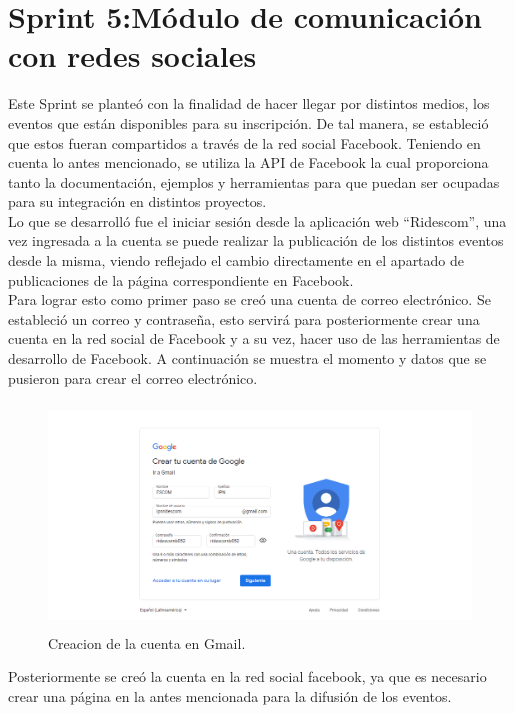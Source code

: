	\section{Sprint 5:Módulo de comunicación con redes sociales}	
	\noindent Este Sprint se planteó con la finalidad de hacer llegar por distintos medios, los eventos que están disponibles para su inscripción. De tal manera, se estableció que estos fueran compartidos a través de la red social Facebook.
	Teniendo en cuenta lo antes mencionado, se utiliza la API de Facebook la cual proporciona tanto la documentación, ejemplos y herramientas para que puedan ser ocupadas para su integración en distintos proyectos. \\
	\noindent Lo que se desarrolló fue el iniciar sesión desde la aplicación web “Ridescom”, una vez ingresada a la cuenta se puede realizar la publicación de los distintos eventos desde la misma, viendo reflejado el cambio directamente en el apartado de publicaciones de la página correspondiente en Facebook. \\
	\noindent Para lograr esto como primer paso se creó una cuenta de correo electrónico. Se estableció un correo y contraseña, esto servirá para posteriormente crear una cuenta en la red social de Facebook y a su vez, hacer uso de las herramientas de desarrollo de Facebook.
	A continuación se muestra el momento y datos que se pusieron para crear el correo electrónico.
	
	\begin{figure}[hbt!]
		\centering
		\includegraphics[width=12cm, height=6cm]{Imagenes/CreacionCuentaFB/CuentaGmail}
		\caption{Creacion de la cuenta en Gmail.}
		\label{cuentagmail}
	\end{figure}
	
	
	\noindent Posteriormente se creó la cuenta en la red social facebook, ya que es necesario crear una página en la antes mencionada para la difusión de los eventos. 
	
